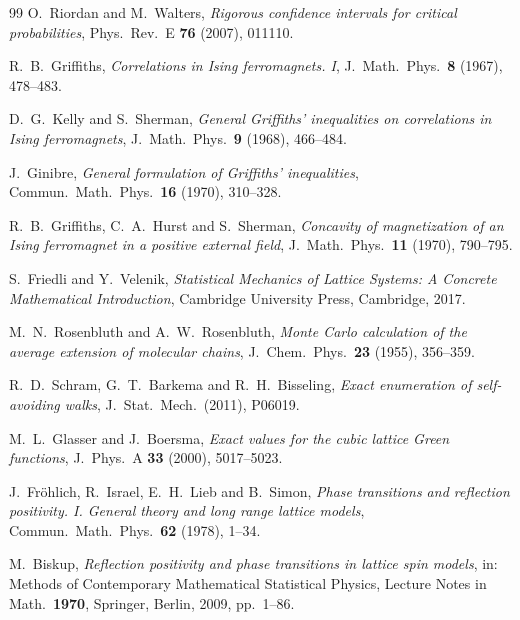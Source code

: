 \begin{thebibliography}{99}
O.~Riordan and M.~Walters,
\emph{Rigorous confidence intervals for critical probabilities},
Phys.\ Rev.\ E \textbf{76} (2007), 011110. 

R.~B.~Griffiths,
\emph{Correlations in Ising ferromagnets. I},
J.\ Math.\ Phys.\ \textbf{8} (1967), 478--483. 

D.~G.~Kelly and S.~Sherman,
\emph{General Griffiths' inequalities on correlations in Ising ferromagnets},
J.\ Math.\ Phys.\ \textbf{9} (1968), 466--484. 

J.~Ginibre,
\emph{General formulation of Griffiths' inequalities},
Commun.\ Math.\ Phys.\ \textbf{16} (1970), 310--328. 

R.~B.~Griffiths, C.~A.~Hurst and S.~Sherman,
\emph{Concavity of magnetization of an Ising ferromagnet in a positive external field},
J.\ Math.\ Phys.\ \textbf{11} (1970), 790--795. 

S.~Friedli and Y.~Velenik,
\emph{Statistical Mechanics of Lattice Systems: A Concrete Mathematical Introduction},
Cambridge University Press, Cambridge, 2017. 

M.~N.~Rosenbluth and A.~W.~Rosenbluth,
\emph{Monte Carlo calculation of the average extension of molecular chains},
J.\ Chem.\ Phys.\ \textbf{23} (1955), 356--359. 

R.~D.~Schram, G.~T.~Barkema and R.~H.~Bisseling,
\emph{Exact enumeration of self-avoiding walks},
J.\ Stat.\ Mech.\ (2011), P06019. 

M.~L.~Glasser and J.~Boersma,
\emph{Exact values for the cubic lattice Green functions},
J.\ Phys.\ A \textbf{33} (2000), 5017--5023. 

J.~Fr\"ohlich, R.~Israel, E.~H.~Lieb and B.~Simon,
\emph{Phase transitions and reflection positivity. I. General theory and long range lattice models},
Commun.\ Math.\ Phys.\ \textbf{62} (1978), 1--34. 

M.~Biskup,
\emph{Reflection positivity and phase transitions in lattice spin models},
in: Methods of Contemporary Mathematical Statistical Physics, Lecture Notes in Math.\ \textbf{1970}, Springer, Berlin, 2009, pp.~1--86. 

\end{thebibliography}
